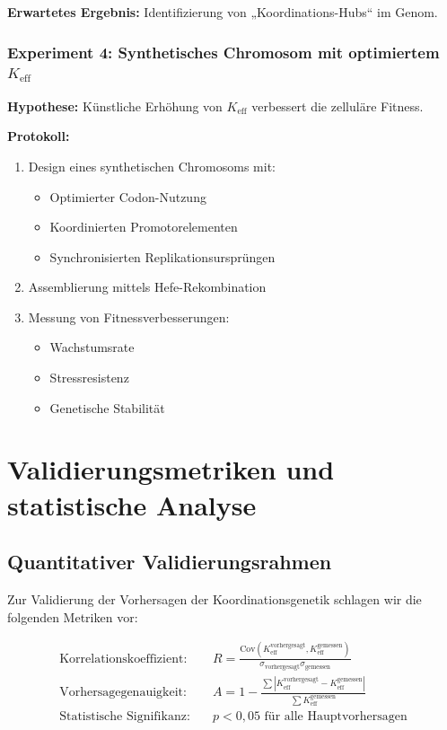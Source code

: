 \documentclass[12pt]{article}
\begin{document}
	\textbf{Erwartetes Ergebnis:} Identifizierung von „Koordinations-Hubs“ im Genom.
	
	\subsubsection{Experiment 4: Synthetisches Chromosom mit optimiertem $K_{\text{eff}}$}
	\textbf{Hypothese:} Künstliche Erhöhung von $K_{\text{eff}}$ verbessert die zelluläre Fitness.
	
	\textbf{Protokoll:}
	\begin{enumerate}
		\item Design eines synthetischen Chromosoms mit:
		\begin{itemize}
			\item Optimierter Codon-Nutzung
			\item Koordinierten Promotorelementen
			\item Synchronisierten Replikationsursprüngen
		\end{itemize}
		\item Assemblierung mittels Hefe-Rekombination
		\item Messung von Fitnessverbesserungen:
		\begin{itemize}
			\item Wachstumsrate
			\item Stressresistenz
			\item Genetische Stabilität
		\end{itemize}
	\end{enumerate}
	
	\section{Validierungsmetriken und statistische Analyse}
	
	\subsection{Quantitativer Validierungsrahmen}
	
	Zur Validierung der Vorhersagen der Koordinationsgenetik schlagen wir die folgenden Metriken vor:
	
	\begin{align*}
		\text{Korrelationskoeffizient:} & \quad R = \frac{\text{Cov}(K_{\text{eff}}^{\text{vorhergesagt}}, K_{\text{eff}}^{\text{gemessen}})}{\sigma_{\text{vorhergesagt}} \sigma_{\text{gemessen}}} \\
		\text{Vorhersagegenauigkeit:} & \quad A = 1 - \frac{\sum |K_{\text{eff}}^{\text{vorhergesagt}} - K_{\text{eff}}^{\text{gemessen}}|}{\sum K_{\text{eff}}^{\text{gemessen}}} \\
		\text{Statistische Signifikanz:} & \quad p < 0,05 \text{ für alle Hauptvorhersagen}
	\end{align*}
	
\end{document}
